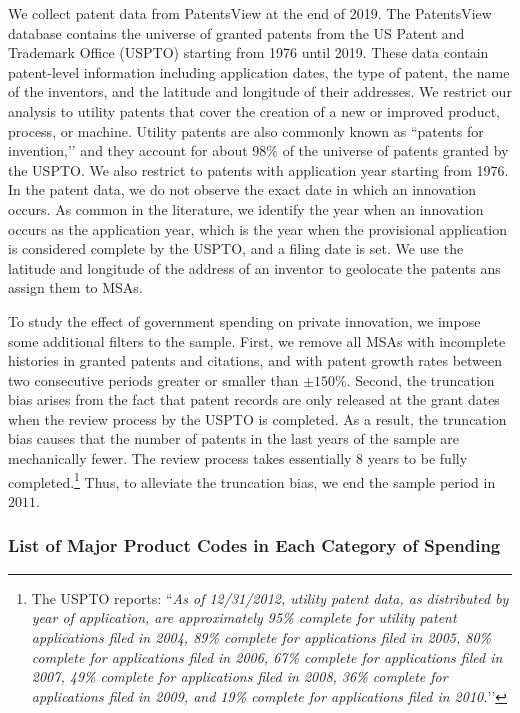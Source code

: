 \documentclass[dv_diss_main.tex]{subfiles}
\begin{document}
We collect patent data from PatentsView at the end of 2019. The PatentsView database contains the universe of granted patents from the US Patent and Trademark Office (USPTO) starting from 1976 until 2019. These data contain patent-level information including application dates, the type of patent, the name of the inventors, and the latitude and longitude of their addresses. We restrict our analysis to utility patents that cover the creation of a new or improved product, process, or machine. Utility patents are also commonly known as ``patents for invention,’’ and they account for about $98\%$ of the universe of patents granted by the USPTO. We also restrict to patents with application year starting from 1976. In the patent data, we do not observe the exact date in which an innovation occurs. As common in the literature, we identify the year when an innovation occurs as the application year, which is the year when the provisional application is considered complete by the USPTO, and a filing date is set. We use the latitude and longitude of the address of an inventor to geolocate the patents ans assign them to MSAs.
 
To study the effect of government spending on private innovation, we impose some additional filters to the sample. First, we remove all MSAs with incomplete histories in granted patents and citations, and with patent growth rates between two consecutive periods greater or smaller than $\pm 150\%$. Second, the truncation bias arises from the fact that patent records are only released at the grant dates when the review process by the USPTO is completed. As a result, the truncation bias causes that the number of patents in the last years of the sample are mechanically fewer. The review process takes essentially $8$ years to be fully completed.\footnote{The USPTO reports:  ``\textit{As of 12/31/2012, utility patent data, as distributed by year of application, are approximately 95\% complete for utility patent applications filed in 2004, 89\% complete for applications filed in 2005, 80\% complete for applications filed in 2006, 67\% complete for applications filed in 2007, 49\% complete for applications filed in 2008, 36\% complete for applications filed in 2009, and 19\% complete for applications filed in 2010.}’’} Thus, to alleviate the truncation bias, we end the sample period in $2011$. 

\subsubsection{List of Major Product Codes in Each Category of Spending}\label{tab:cat_list}
\end{document}
